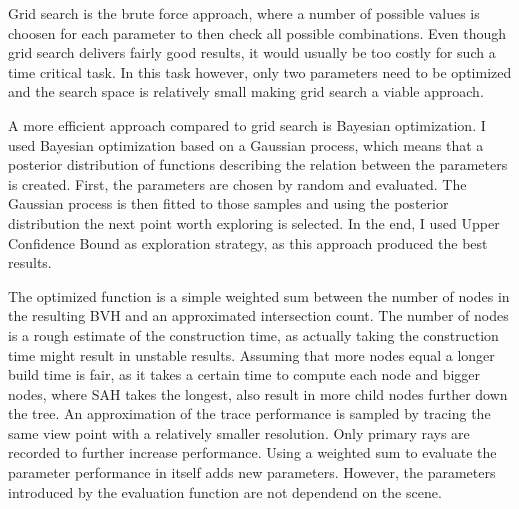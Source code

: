 Grid search is the brute force approach, where a number of possible values is choosen for each parameter to then check all possible combinations. Even though grid search delivers fairly good results, it would usually be too costly for such a time critical task. In this task however, only two parameters need to be optimized and the search space is relatively small making grid search a viable approach. 

A more efficient approach compared to grid search is Bayesian optimization. I used Bayesian optimization based on a Gaussian process, which means that a posterior distribution of functions describing the relation between the parameters is created. First, the parameters are chosen by random and evaluated. The Gaussian process is then fitted to those samples and using the posterior distribution the next point worth exploring is selected. In the end, I used Upper Confidence Bound as exploration strategy, as this approach produced the best results. 

The optimized function is a simple weighted sum between the number of nodes in the resulting BVH and an approximated intersection count. The number of nodes is a rough estimate of the construction time, as actually taking the construction time might result in unstable results. Assuming that more nodes equal a longer build time is fair, as it takes a certain time to compute each node and bigger nodes, where SAH takes the longest, also result in more child nodes further down the tree. An approximation of the trace performance is sampled by tracing the same view point with a relatively smaller resolution. Only primary rays are recorded to further increase performance. 
Using a weighted sum to evaluate the parameter performance in itself adds new parameters. However, the parameters introduced by the evaluation function are not dependend on the scene. %